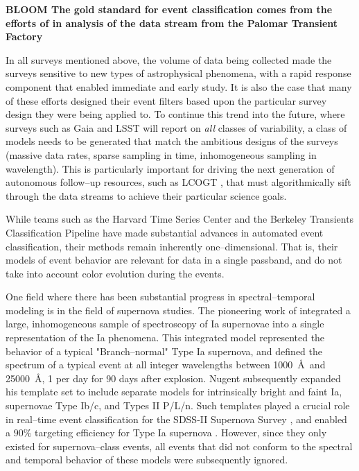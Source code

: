 
{\bf BLOOM The gold standard for event classification comes from the efforts of
\cite{X} in analysis of the data stream from the Palomar Transient Factory
\citep{X}}

In all surveys mentioned above, the volume of data being collected made the
surveys sensitive to new types of astrophysical phenomena, with a rapid response
component that enabled immediate and early study.  It is also the case that many
of these efforts designed their event filters based upon the particular survey
design they were being applied to.  To continue this trend into the future,
where surveys such as Gaia \citep{X} and LSST \citep{X} will report on {\it all}
classes of variability, a class of models needs to be generated that match the
ambitious designs of the surveys (massive data rates, sparse sampling in time,
inhomogeneous sampling in wavelength).  This is particularly important for
driving the next generation of autonomous follow--up resources, such as LCOGT
\citep{2008AN....329..269H}, that must algorithmically sift through the data
streams to achieve their particular science goals.

 \smallskip

While teams such as the Harvard Time Series Center \citep{} and the Berkeley
Transients Classification Pipeline \citep{} have made substantial advances in
automated event classification, their methods remain inherently
one--dimensional. That is, their models of event behavior are relevant for data
in a single passband, and do not take into account color evolution during the
events.

One field where there has been substantial progress in spectral--temporal
modeling is in the field of supernova studies. The pioneering work of
\cite{2002PASP..114..803N} integrated a large, inhomogeneous sample of
spectroscopy of Ia supernovae into a single representation of the Ia phenomena.
This integrated model represented the behavior of a typical "Branch--normal"
Type Ia supernova, and defined the spectrum of a typical event at all integer
wavelengths between 1000~\AA~and 25000~\AA, 1 per day for 90 days after
explosion.  Nugent subsequently expanded his template set to include separate
models for intrinsically bright and faint Ia, supernovae Type Ib/c, and Types II
P/L/n. Such templates played a crucial role in real--time event classification
for the SDSS-II Supernova Survey \citep{2008AJ....135..338F}, and enabled a
$90\%$ targeting efficiency for Type Ia supernova \citep{2008AJ....135..348S}.
However, since they only existed for supernova--class events, all events that
did not conform to the spectral and temporal behavior of these models were
subsequently ignored.


